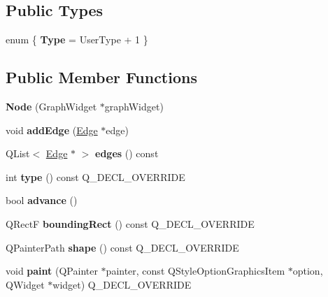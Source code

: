 \subsection*{Public Types}
\begin{DoxyCompactItemize}
\item 
\hypertarget{classNode_ae716c5198bdf4b0a810324756b0f8f11}{}enum \{ {\bfseries Type} = User\+Type + 1
 \}\label{classNode_ae716c5198bdf4b0a810324756b0f8f11}

\end{DoxyCompactItemize}
\subsection*{Public Member Functions}
\begin{DoxyCompactItemize}
\item 
\hypertarget{classNode_a1090d2bb7bd9193be765a03984b7b101}{}{\bfseries Node} (Graph\+Widget $\ast$graph\+Widget)\label{classNode_a1090d2bb7bd9193be765a03984b7b101}

\item 
\hypertarget{classNode_af761aaef36a761a90c4f148a6add914d}{}void {\bfseries add\+Edge} (\hyperlink{classEdge}{Edge} $\ast$edge)\label{classNode_af761aaef36a761a90c4f148a6add914d}

\item 
\hypertarget{classNode_a339261597715c88141ccb52d8e10f38c}{}Q\+List$<$ \hyperlink{classEdge}{Edge} $\ast$ $>$ {\bfseries edges} () const \label{classNode_a339261597715c88141ccb52d8e10f38c}

\item 
\hypertarget{classNode_a5ff23cc2756595673d0379f19b9a0de9}{}int {\bfseries type} () const Q\+\_\+\+D\+E\+C\+L\+\_\+\+O\+V\+E\+R\+R\+I\+D\+E\label{classNode_a5ff23cc2756595673d0379f19b9a0de9}

\item 
\hypertarget{classNode_ad034abb95cd42d4e577aeb5009ae8d23}{}bool {\bfseries advance} ()\label{classNode_ad034abb95cd42d4e577aeb5009ae8d23}

\item 
\hypertarget{classNode_a91b9aa621ce72fd974ab972ffeb6ec52}{}Q\+Rect\+F {\bfseries bounding\+Rect} () const Q\+\_\+\+D\+E\+C\+L\+\_\+\+O\+V\+E\+R\+R\+I\+D\+E\label{classNode_a91b9aa621ce72fd974ab972ffeb6ec52}

\item 
\hypertarget{classNode_aa1a523740f6a0694abbe690e07eb1d36}{}Q\+Painter\+Path {\bfseries shape} () const Q\+\_\+\+D\+E\+C\+L\+\_\+\+O\+V\+E\+R\+R\+I\+D\+E\label{classNode_aa1a523740f6a0694abbe690e07eb1d36}

\item 
\hypertarget{classNode_afa10e3bbea7f308c3eddcc6097748d13}{}void {\bfseries paint} (Q\+Painter $\ast$painter, const Q\+Style\+Option\+Graphics\+Item $\ast$option, Q\+Widget $\ast$widget) Q\+\_\+\+D\+E\+C\+L\+\_\+\+O\+V\+E\+R\+R\+I\+D\+E\label{classNode_afa10e3bbea7f308c3eddcc6097748d13}

\end{DoxyCompactItemize}
